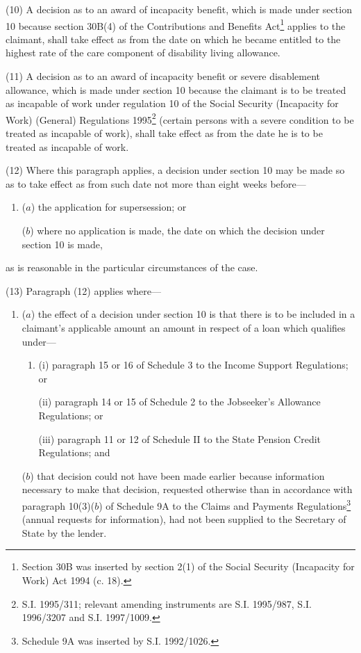 \documentclass[12pt,a4paper]{article}
\begin{document}
(10) A decision as to an award of incapacity benefit, which is made under section 10 because section 30B(4) of the Contributions and Benefits Act\footnote{\frenchspacing Section 30B was inserted by section 2(1) of the Social Security (Incapacity for Work) Act 1994 (c. 18).} applies to the claimant, shall take effect as from the date on which he became entitled to the highest rate of the care component of disability living allowance.

(11) A decision as to an award of incapacity benefit or severe disablement allowance, which is made under section 10 because the claimant is to be treated as incapable of work under regulation 10 of the Social Security (Incapacity for Work) (General) Regulations 1995\footnote{\frenchspacing S.I. 1995/311; relevant amending instruments are S.I. 1995/987, S.I. 1996/3207 and S.I. 1997/1009.} (certain persons with a severe condition to be treated as incapable of work), shall take effect as from the date he is to be treated as incapable of work.

(12) Where this paragraph applies, a decision under section 10 may be made so as to take effect as from such date not more than eight weeks before—
\begin{enumerate}\item[]
($a$) the application for supersession; or

($b$) where no application is made, the date on which the decision under section 10 is made,
\end{enumerate}
as is reasonable in the particular circumstances of the case.

(13) Paragraph (12) applies where—
\begin{enumerate}\item[]
($a$) the effect of a decision under section 10 is that there is to be included in a claimant’s applicable amount an amount in respect of a loan which qualifies under—
\begin{enumerate}\item[]
(i) paragraph 15 or 16 of Schedule 3 to the Income Support Regulations; or

(ii) paragraph 14 or 15 of Schedule 2 to the Jobseeker’s Allowance Regulations;
or

    (iii) 
    paragraph 11 or 12 of Schedule II to the State Pension Credit Regulations; and %
\end{enumerate}

($b$) that decision could not have been made earlier because information necessary to make that decision, requested otherwise than in accordance with paragraph 10(3)($b$) of Schedule 9A to the Claims and Payments Regulations\footnote{\frenchspacing Schedule 9A was inserted by S.I. 1992/1026.} (annual requests for information), had not been supplied to the Secretary of State by the lender.
\end{enumerate}
\end{document}
